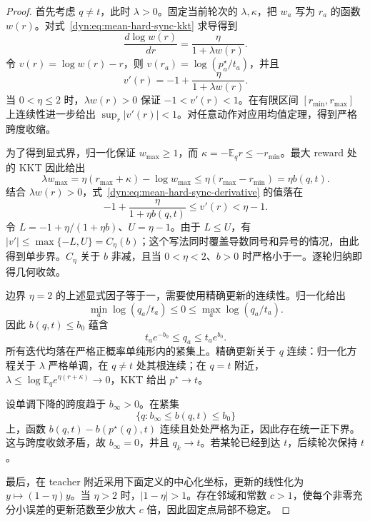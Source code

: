 \documentclass[lang=cn,scheme=chinese,openany]{../book/elegantbook}
\newcommand{\E}{\mathbb E}
\begin{document}
\begin{proof}
首先考虑 $q\ne t$，此时 $\lambda>0$。固定当前轮次的 $\lambda,\kappa$，把 $w_a$ 写为 $r_a$ 的函数 $w(r)$。对式~\eqref{dyn:eq:mean-hard-sync-kkt} 求导得到
\begin{equation*}
 \frac{d\log w(r)}{dr}=\frac{\eta}{1+\lambda w(r)}.
\end{equation*}
令 $v(r)=\log w(r)-r$，则 $v(r_a)=\log(p_a^\star/t_a)$，并且
\begin{equation}
 v'(r)=-1+\frac{\eta}{1+\lambda w(r)}.
 \label{dyn:eq:mean-hard-sync-derivative}
\end{equation}
当 $0<\eta\le2$ 时，$\lambda w(r)>0$ 保证 $-1<v'(r)<1$。在有限区间 $[r_{\min},r_{\max}]$ 上连续性进一步给出 $\sup_r|v'(r)|<1$。对任意动作对应用均值定理，得到严格跨度收缩。

为了得到显式界，归一化保证 $w_{\max}\ge1$，而 $\kappa=-\E_qr\le-r_{\min}$。最大 reward 处的 KKT 因此给出
\begin{equation*}
 \lambda w_{\max}
 =\eta(r_{\max}+\kappa)-\log w_{\max}
 \le\eta(r_{\max}-r_{\min})=\eta b(q,t).
\end{equation*}
结合 $\lambda w(r)>0$，式~\eqref{dyn:eq:mean-hard-sync-derivative} 的值落在
\begin{equation*}
 -1+\frac{\eta}{1+\eta b(q,t)}\le v'(r)<\eta-1.
\end{equation*}
令 $L=-1+\eta/(1+\eta b)$、$U=\eta-1$。由于 $L\le U$，有 $|v'|\le\max\{-L,U\}=C_\eta(b)$；这个写法同时覆盖导数同号和异号的情况，由此得到单步界。$C_\eta$ 关于 $b$ 非减，且当 $0<\eta<2$、$b>0$ 时严格小于一。逐轮归纳即得几何收敛。

边界 $\eta=2$ 的上述显式因子等于一，需要使用精确更新的连续性。归一化给出
\begin{equation*}
 \min_a\log(q_a/t_a)\le0\le\max_a\log(q_a/t_a).
\end{equation*}
因此 $b(q,t)\le b_0$ 蕴含
\begin{equation*}
 t_ae^{-b_0}\le q_a\le t_ae^{b_0}.
\end{equation*}
所有迭代均落在严格正概率单纯形内的紧集上。精确更新关于 $q$ 连续：归一化方程关于 $\lambda$ 严格单调，在 $q\ne t$ 处其根连续；在 $q=t$ 附近，$\lambda\le\log\E_qe^{\eta(r+\kappa)}\to0$，KKT 给出 $p^\star\to t$。

设单调下降的跨度趋于 $b_\infty>0$。在紧集
\begin{equation*}
 \{q:b_\infty\le b(q,t)\le b_0\}
\end{equation*}
上，函数 $b(q,t)-b(p^\star(q),t)$ 连续且处处严格为正，因此存在统一正下界。这与跨度收敛矛盾，故 $b_\infty=0$，并且 $q_k\to t$。若某轮已经到达 $t$，后续轮次保持 $t$。

最后，在 teacher 附近采用下面定义的中心化坐标，更新的线性化为 $y\mapsto(1-\eta)y$。当 $\eta>2$ 时，$|1-\eta|>1$。存在邻域和常数 $c>1$，使每个非零充分小误差的更新范数至少放大 $c$ 倍，因此固定点局部不稳定。
\end{proof}
\end{document}
